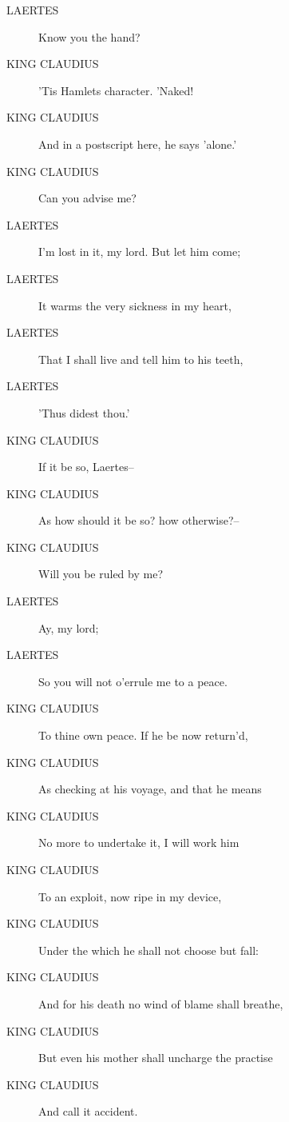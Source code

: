 \documentclass{article}
\begin{document}
\begin{description}
            
\item[LAERTES] Know you the hand?
\end{description}
          
\begin{description}
            
\item[KING CLAUDIUS] 'Tis Hamlets character. 'Naked!
\item[KING CLAUDIUS] And in a postscript here, he says 'alone.'
\item[KING CLAUDIUS] Can you advise me?
\end{description}
          
\begin{description}
            
\item[LAERTES] I'm lost in it, my lord. But let him come;
\item[LAERTES] It warms the very sickness in my heart,
\item[LAERTES] That I shall live and tell him to his teeth,
\item[LAERTES] 'Thus didest thou.'
\end{description}
          
\begin{description}
            
\item[KING CLAUDIUS] If it be so, Laertes--
\item[KING CLAUDIUS] As how should it be so? how otherwise?--
\item[KING CLAUDIUS] Will you be ruled by me?
\end{description}
          
\begin{description}
            
\item[LAERTES] Ay, my lord;
\item[LAERTES] So you will not o'errule me to a peace.
\end{description}
          
\begin{description}
            
\item[KING CLAUDIUS] To thine own peace. If he be now return'd,
\item[KING CLAUDIUS] As checking at his voyage, and that he means
\item[KING CLAUDIUS] No more to undertake it, I will work him
\item[KING CLAUDIUS] To an exploit, now ripe in my device,
\item[KING CLAUDIUS] Under the which he shall not choose but fall:
\item[KING CLAUDIUS] And for his death no wind of blame shall breathe,
\item[KING CLAUDIUS] But even his mother shall uncharge the practise
\item[KING CLAUDIUS] And call it accident.
\end{description}
          
\end{document}
